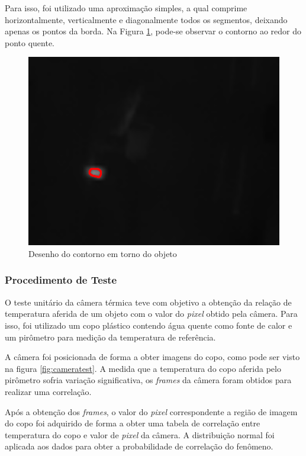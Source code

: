 		Para isso, foi utilizado uma aproximação simples, a qual comprime horizontalmente, verticalmente e diagonalmente todos os segmentos, deixando apenas os pontos da borda. Na Figura \ref{fig:contour}, pode-se observar o contorno ao redor do ponto quente.
		
		\begin{figure}[!ht]
		   \centering
		   \includegraphics[width=12cm]{Figures/contorno.png}
		   \caption{Desenho do contorno em torno do objeto}
		   \label{fig:contour}
		\end{figure}
		
		\subsubsection{Procedimento de Teste}
		
		O teste unitário da câmera térmica teve com objetivo a obtenção da relação de temperatura aferida de um objeto com o valor do \textit{pixel} obtido pela câmera. Para isso, foi utilizado um copo plástico contendo água quente como fonte de calor e um pirômetro para medição da temperatura de referência.
		
		 A câmera foi posicionada de forma a obter imagens do copo, como pode ser visto na figura \ref{fig:cameratest}. A medida que a temperatura do copo aferida pelo pirômetro sofria variação significativa, os \textit{frames} da câmera foram obtidos para realizar uma correlação. 
		 
		 Após a obtenção dos \textit{frames}, o valor do \textit{pixel} correspondente a região de imagem do copo foi adquirido de forma a obter uma tabela de correlação entre temperatura do copo e valor de \textit{pixel} da câmera. A distribuição normal foi aplicada aos dados para obter a probabilidade de correlação do fenômeno.

